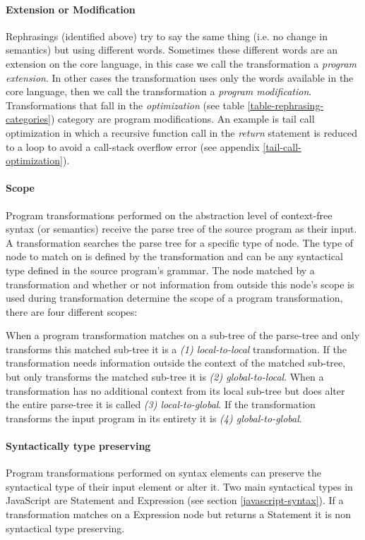 \paragraph{Extension or Modification}
Rephrasings (identified above) try to say the same thing (i.e. no change in semantics) but using different words\cite{Visser2001}. Sometimes these different words are an extension on the core language, in this case we call the transformation a \textit{program extension}. In other cases the transformation uses only the words available in the core language, then we call the transformation a \textit{program modification}. Transformations that fall in the \textit{optimization} (see table \ref{table-rephrasing-categories}) category are program modifications. An example is tail call optimization in which a recursive function call in the \textit{return} statement is reduced to a loop to avoid a call-stack overflow error (see appendix \ref{tail-call-optimization}). 

\paragraph{Scope}
Program transformations performed on the abstraction level of context-free syntax (or semantics) receive the parse tree of the source program as their input. A transformation searches the parse tree for a specific type of node. The type of node to match on is defined by the transformation and can be any syntactical type defined in the source program's grammar. The node matched by a transformation and whether or not information from outside this node's scope is used during transformation determine the scope of a program transformation, there are four different scopes:

When a program transformation matches on a sub-tree of the parse-tree and only transforms this matched sub-tree it is a \textit{(1) local-to-local} transformation. If the transformation needs information outside the context of the matched sub-tree, but only transforms the matched sub-tree it is \textit{(2) global-to-local}. When a transformation has no additional context from its local sub-tree but does alter the entire parse-tree it is called \textit{(3) local-to-global}. If the transformation transforms the input program in its entirety it is \textit{(4) global-to-global}.  

\paragraph{Syntactically type preserving}
Program transformations performed on syntax elements can preserve the syntactical type of their input element or alter it. Two main syntactical types in JavaScript are Statement and Expression (see section \ref{javascript-syntax}). If a transformation matches on a Expression node but returns a Statement it is non syntactical type preserving.

